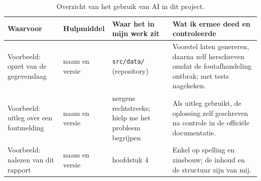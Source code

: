 \begin{table}[htbp]
  \centering\small
  \begin{tabularx}{\textwidth}{@{}>{\raggedright\arraybackslash}p{}>{\raggedright\arraybackslash}p{}>{\raggedright\arraybackslash}X>{\raggedright\arraybackslash}X@{}}
    \toprule
    \textbf{Waarvoor} & \textbf{Hulpmiddel} & \textbf{Waar het in mijn werk zit} & \textbf{Wat ik ermee deed en controleerde} \\
    \midrule
    Voorbeeld: opzet van de gegevenslaag
      & naam en versie
      & \texttt{src/data/} \newline (repository)
      & Voorstel laten genereren, daarna zelf herschreven omdat de foutafhandeling ontbrak; met tests nagekeken. \\
    Voorbeeld: uitleg over een foutmelding
      & naam en versie
      & nergens rechtstreeks; hielp me het probleem begrijpen
      & Als uitleg gebruikt, de oplossing zelf geschreven na controle in de officiële documentatie. \\
    Voorbeeld: nalezen van dit rapport
      & naam en versie
      & hoofdstuk 4
      & Enkel op spelling en zinsbouw; de inhoud en de structuur zijn van mij. \\
    \bottomrule
  \end{tabularx}
  \caption[Gebruik van AI in dit project]{\label{tab:ai}%
    Overzicht van het gebruik van AI in dit project.}
\end{table}

\section{}%
\label{sec:ai-eigenwerk}


\section{}%
\label{sec:ai-regelgeving}

